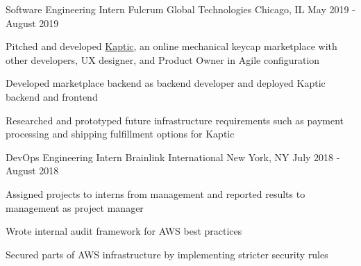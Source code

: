 \begin{cventries}
  \cventry
    {Software Engineering Intern}
    {Fulcrum Global Technologies}
    {Chicago, IL}
    {May 2019 - August 2019}
    {
      \begin{cvitems}
        \item {Pitched and developed \href{https://kaptickeys.com/}{Kaptic}, an online mechanical keycap marketplace with other developers, UX designer, and Product Owner in Agile configuration}
        \item {Developed marketplace backend as backend developer and deployed Kaptic backend and frontend}
        \item {Researched and prototyped future infrastructure requirements such as payment processing and shipping fulfillment options for Kaptic}
      \end{cvitems}
    }

  \cventry
    {DevOps Engineering Intern}
    {Brainlink International}
    {New York, NY}
    {July 2018 - August 2018}
    {
      \begin{cvitems}
        \item {Assigned projects to interns from management and reported results to management as project manager}
        \item {Wrote internal audit framework for AWS best practices}
        \item {Secured parts of AWS infrastructure by implementing stricter security rules}
      \end{cvitems}
    }

  

\end{cventries}

